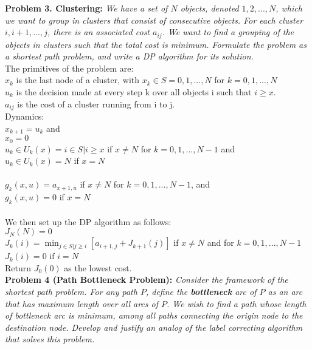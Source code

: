 \documentclass[11pt, english]{article}
\begin{document}
\textbf{Problem 3. Clustering:} \textit{We have a set of $N$ objects, denoted $1, 2, . . . , N$, which we want to group in clusters that consist of consecutive objects. For each cluster $i, i + 1, . . . , j$, there is an associated cost $a_{ij}$. We want to find a grouping of the objects in clusters such that the total cost is minimum. Formulate the problem as a shortest path problem, and write a DP algorithm for its solution.}\\

The primitives of the problem are:\\
$x_k$ is the last node of a cluster, with $x_k \in S = {0, 1, ..., N}$ for $k = 0, 1, ..., N$\\
$u_k$ is the decision made at every step k over all objects i such that $i \geq x$.\\
$a_{ij}$ is the cost of a cluster running from i to j.\\
Dynamics:\\
$x_{k+1} = u_k$ and\\
$x_0 = 0$\\
$u_k \in U_k(x) = {i \in S | i\geq x}$ if $x \neq N$ for $k = 0, 1, ..., N-1$ and\\
$u_k \in U_k(x) = {N}$ if $x= N$\\
\\
$g_k(x, u) = a_{x+1,u}$ if $x \neq N$ for $k = 0, 1, ..., N-1$, and \\
$g_k(x, u) = 0$ if $x = N$\\
\\
We then set up the DP algorithm as follows:\\
$J_N(N) = 0$\\
$J_k(i) = \displaystyle \min_{j \in S|j \geq i}[a_{i+1,j} + J_{k+1}(j)]$ if $x \neq N$ and for $k = 0, 1, ..., N-1$\\
$J_k(i) = 0$ if $i = N$\\
Return $J_0(0)$ as the lowest cost.\\


\textbf{Problem 4 (Path Bottleneck Problem):}\textit{ Consider the framework of the shortest path problem. For any path $P$, define the \textbf{bottleneck} arc of $P$ as an arc that has maximum length over all arcs of $P$. We wish to find a path whose length of bottleneck arc is minimum, among all paths connecting the origin node to the destination node. Develop and justify an analog of the label correcting algorithm that solves this problem. }
\end{document}
